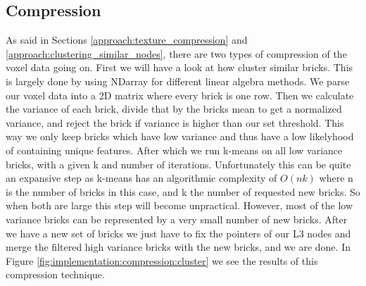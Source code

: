 \subsection{Compression} \label{implementation:compression}
As said in Sections \ref{approach:texture_compression} and \ref{approach:clustering_similar_nodes}, there are two types of compression of the voxel data going on. First we will have a look at how cluster similar bricks. This is largely done by using NDarray \cite{NDarray} for different linear algebra methods. We parse our voxel data into a 2D matrix where every brick is one row. Then we calculate the variance of each brick, divide that by the bricks mean to get a normalized variance, and reject the brick if variance is higher than our set threshold. This way we only keep bricks which have low variance and thus have a low likelyhood of containing unique features. After which we run k-means on all low variance bricks, with a given k and number of iterations. Unfortunately this can be quite an expansive step as k-means has an algorithmic complexity of $O(nk)$ where n is the number of bricks in this case, and k the number of requested new bricks. So when both are large this step will become unpractical. However, most of the low variance bricks can be represented by a very small number of new bricks. After we have a new set of bricks we just have to fix the pointers of our L3 nodes and merge the filtered high variance bricks with the new bricks, and we are done. In Figure \ref{fig:implementation:compression:cluster} we see the results of this compression technique.

